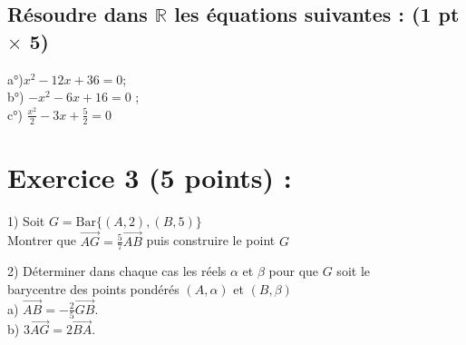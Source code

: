 \documentclass[12pt]{article}
\begin{document}
\subsection*{ Résoudre dans $\mathbb{R}$ les équations suivantes : (1 pt $\times$ 5)}
a°)$x^{2}-12x+36=0$;\\ 
b°) $-x^{2}-6x+16=0$ ;\\
c°) $\frac{x^{2}}{2}-3x+\frac{5}{2}=0$\\
\section*{Exercice 3 (5 points) :}
1) Soit $G=\mathrm{Bar}\lbrace (A,2),(B,5)\rbrace$\\
Montrer que $\overrightarrow{AG}=\frac{5}{7}\overrightarrow{AB}$ puis construire le point $G$

2) Déterminer dans chaque cas les réels $\alpha$ et $\beta$ pour que $G$ soit le \\barycentre des points pondérés $(A,\alpha)$ et $(B,\beta)$\\
a) $\overrightarrow{AB}=-\frac{2}{5}\overrightarrow{GB}$.\\
b) $3\overrightarrow{AG}=2\overrightarrow{BA}$.\\
\end{document}
